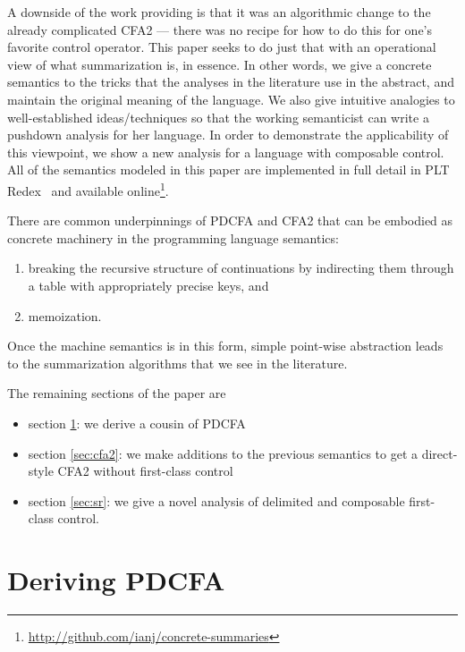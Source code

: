 \documentclass{llncs}
\newcommand{\Scribtexttt}[1]{{\texttt{#1}}}
\newcommand{\SColorize}[2]{\color{#1}{#2}}
\newcommand{\inColor}[2]{{\Scribtexttt{\SColorize{#1}{#2}}}}
\newcommand{\rackett}[1]{\inColor{black}{#1}}
\begin{document}
A downside of the work providing \rackett{call/cc} is that it was an
algorithmic change to the already complicated CFA2 --- there was no
recipe for how to do this for one's favorite control operator. This
paper seeks to do just that with an operational view of what
summarization is, in essence. In other words, we give a concrete
semantics to the tricks that the analyses in the literature use in the
abstract, and maintain the original meaning of the language. We also
give intuitive analogies to well-established ideas/techniques so that
the working semanticist can write a pushdown analysis for her
language. In order to demonstrate the applicability of this viewpoint,
we show a new analysis for a language with composable control. All of
the semantics modeled in this paper are implemented in full detail in
PLT Redex~\citep{ianjohnson:Felleisen:2009:SEP:1795772} and available
online\footnote{\url{http://github.com/ianj/concrete-summaries}}.

There are common underpinnings of PDCFA and CFA2 that can be embodied
as concrete machinery in the programming language semantics: 
\begin{enumerate}
\item{breaking the recursive structure of continuations by indirecting them through a
table with appropriately precise keys, and}
\item{memoization.}
\end{enumerate}
Once the machine semantics is in this form, simple point-wise
abstraction leads to the summarization algorithms that we see in the
literature.

The remaining sections of the paper are
\begin{itemize}
\item{section \ref{sec:pdcfa}: we derive a cousin of PDCFA}
\item{section \ref{sec:cfa2}: we make additions to the previous semantics to get a direct-style CFA2 without first-class control}
\item{section \ref{sec:sr}: we give a novel analysis of delimited and composable first-class control.}
\end{itemize}

\section{Deriving PDCFA}
\label{sec:pdcfa}
\end{document}

